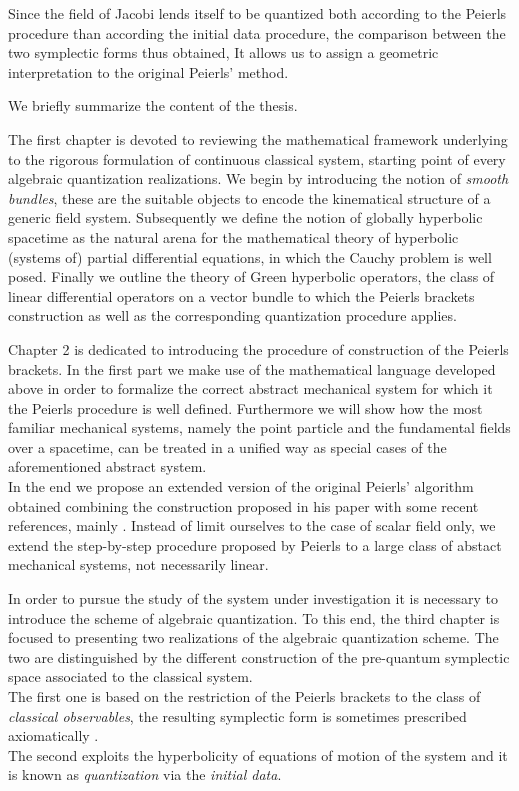 \documentclass[Main]{subfiles}
\begin{document}
Since the field of Jacobi lends itself to be quantized both according to the Peierls procedure than according the initial data procedure,
the comparison between the two symplectic forms thus obtained,
It allows us to assign a geometric interpretation to the original Peierls' method.

\vspace{3mm}
We briefly summarize the content of the thesis.

The first chapter is devoted to reviewing the mathematical framework  underlying to the rigorous formulation of continuous classical system, starting point of every algebraic quantization realizations.
We begin by introducing the notion of \emph{smooth bundles}, these are the suitable objects to encode the kinematical structure of a generic field system.
Subsequently we define the notion of globally hyperbolic spacetime as  the natural arena for the mathematical theory of hyperbolic (systems of) partial differential equations, in which the Cauchy problem is well posed.
Finally we outline the theory of Green hyperbolic operators, the class of linear differential operators on a vector bundle to which the Peierls brackets construction as well as the corresponding quantization procedure applies.

Chapter 2 is dedicated to introducing the procedure of construction of the Peierls brackets.
In the first part we make use of the mathematical language developed above in order to formalize the correct abstract mechanical system for which it the Peierls procedure is well defined. Furthermore we will show how the most familiar mechanical systems, namely the point particle and the fundamental fields over a spacetime, can be treated in a unified way as special cases of the aforementioned abstract system.
\\
In the end we propose an extended version of the original Peierls' algorithm obtained combining the construction proposed in his paper\cite{Peierls1952} with some recent references, mainly \cite{Marolf1993}\cite{Dewitt1999}\cite{Forger2005}\cite{Sharan2010}\cite{Khavkine2014}.
Instead of limit ourselves to the case of scalar field only, we extend the step-by-step procedure proposed by Peierls to a large class of abstact mechanical systems, not necessarily linear.

In order to pursue the study of the system under investigation it is necessary to introduce the scheme of algebraic quantization.
To this end, the third chapter is focused to presenting two realizations of the algebraic quantization scheme.
The two are distinguished by the different construction of the pre-quantum symplectic space associated to the classical system.
\\
The first one is based on the restriction of the Peierls brackets to the class of \emph{classical observables}, the resulting symplectic form is sometimes prescribed axiomatically \cite{Dewitt1999}\cite{Esposito}\cite{Benini}.\\
The second exploits the hyperbolicity of equations of motion of the system and it is known as \emph{quantization} via the \emph{initial data}\cite{Wald1994}.
\end{document}
